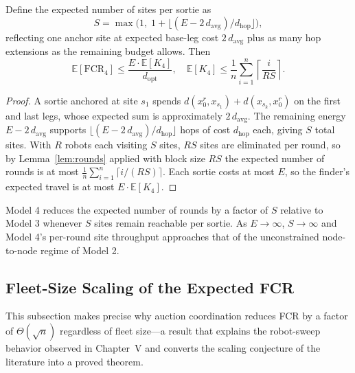 \begin{doublespacing}
\begin{theorem}\label{thm:m4}
Define the expected number of sites per sortie as
\[
  S = \max\!\big(1,\; 1 + \lfloor (E - 2\,d_{\mathrm{avg}}) / d_{\mathrm{hop}} \rfloor\big),
\]
reflecting one anchor site at expected base-leg cost $2\,d_{\mathrm{avg}}$
plus as many hop extensions as the remaining budget allows. Then
\[
  \mathbb{E}[\mathrm{FCR}_4] \leq \frac{E \cdot \mathbb{E}[K_4]}{d_{\mathrm{opt}}},
  \quad \mathbb{E}[K_4] \leq \frac{1}{n} \sum_{i=1}^n \left\lceil \frac{i}{RS} \right\rceil.
\]
\end{theorem}

\begin{proof}
A sortie anchored at site $s_1$ spends $d(x_0^r, x_{s_1}) + d(x_{s_k}, x_0^r)$
on the first and last legs, whose expected sum is approximately
$2\,d_{\mathrm{avg}}$. The remaining energy $E - 2\,d_{\mathrm{avg}}$
supports $\lfloor (E - 2\,d_{\mathrm{avg}})/d_{\mathrm{hop}}\rfloor$
hops of cost $d_{\mathrm{hop}}$ each, giving $S$ total sites. With $R$
robots each visiting $S$ sites, $RS$ sites are eliminated per round,
so by Lemma~\ref{lem:rounds} applied with block size $RS$ the
expected number of rounds is at most
$\frac{1}{n}\sum_{i=1}^n \lceil i / (RS) \rceil$. Each sortie costs at
most $E$, so the finder's expected travel is at most
$E \cdot \mathbb{E}[K_4]$.
\end{proof}

\begin{corollary}\label{cor:improvement}
Model 4 reduces the expected number of rounds by a factor of $S$
relative to Model 3 whenever $S$ sites remain reachable per sortie.
As $E \to \infty$, $S \to \infty$ and Model 4's per-round site
throughput approaches that of the unconstrained node-to-node regime
of Model 2.
\end{corollary}

\subsection{Fleet-Size Scaling of the Expected FCR}\label{sec:scaling}

This subsection makes precise why auction coordination reduces FCR by
a factor of $\Theta(\sqrt{n})$ regardless of fleet size---a result
that explains the robot-sweep behavior observed in Chapter~V and
converts the scaling conjecture of the literature into a proved theorem.


\end{doublespacing}
